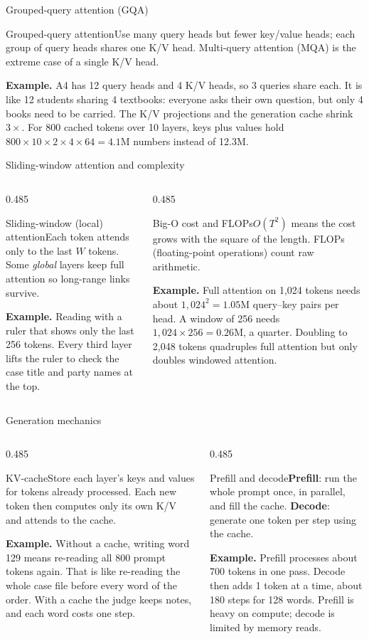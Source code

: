 \documentclass[aspectratio=169,11pt]{beamer}
\newcommand{\term}[3]{%
  \begin{block}{#1}\small #2\par\vspace{1mm}%
  {\color{exgreen}\textbf{Example.}} #3\end{block}}
\newcommand{\twoterms}[6]{%
  \begin{columns}[T]
    \begin{column}{0.485\textwidth}\term{#1}{#2}{#3}\end{column}
    \begin{column}{0.485\textwidth}\term{#4}{#5}{#6}\end{column}
  \end{columns}}
\begin{document}
\begin{frame}{Grouped-query attention (GQA)}
  \term{Grouped-query attention}
  {Use many query heads but fewer key/value heads; each group of query heads shares one K/V head. Multi-query attention (MQA) is the extreme case of a single K/V head.}
  {A4 has 12 query heads and 4 K/V heads, so 3 queries share each. It is like 12 students sharing 4 textbooks: everyone asks their own question, but only 4 books need to be carried. The K/V projections and the generation cache shrink $3\times$. For 800 cached tokens over 10 layers, keys plus values hold $800\times10\times2\times4\times64=4.1$M numbers instead of 12.3M.}
\end{frame}

\begin{frame}{Sliding-window attention and complexity}
  \twoterms{Sliding-window (local) attention}
  {Each token attends only to the last $W$ tokens. Some \emph{global} layers keep full attention so long-range links survive.}
  {Reading with a ruler that shows only the last 256 tokens. Every third layer lifts the ruler to check the case title and party names at the top.}
  {Big-O cost and FLOPs}
  {$O(T^2)$ means the cost grows with the square of the length. FLOPs (floating-point operations) count raw arithmetic.}
  {Full attention on 1,024 tokens needs about $1{,}024^2 = 1.05$M query--key pairs per head. A window of 256 needs $1{,}024\times256 = 0.26$M, a quarter. Doubling to 2,048 tokens quadruples full attention but only doubles windowed attention.}
\end{frame}

\begin{frame}{Generation mechanics}
  \twoterms{KV-cache}
  {Store each layer's keys and values for tokens already processed. Each new token then computes only its own K/V and attends to the cache.}
  {Without a cache, writing word 129 means re-reading all 800 prompt tokens again. That is like re-reading the whole case file before every word of the order. With a cache the judge keeps notes, and each word costs one step.}
  {Prefill and decode}
  {\textbf{Prefill}: run the whole prompt once, in parallel, and fill the cache. \textbf{Decode}: generate one token per step using the cache.}
  {Prefill processes about 700 tokens in one pass. Decode then adds 1 token at a time, about 180 steps for 128 words. Prefill is heavy on compute; decode is limited by memory reads.}
\end{frame}
\end{document}
